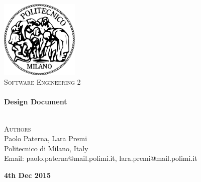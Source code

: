 \begin{titlepage}
\begin{center}


~\\[1cm]
\includegraphics[width=0.28\textwidth]{./images/logo-polimi}~\\[1.5cm]

\textsc{\huge \textsc{Software Engineering 2}
}
\\[1cm]

\HRule \\[0.4cm]
{ \huge \bfseries Design Document\\[0.3cm]
		}
\HRule \\[1.5cm]

\noindent
\begin{minipage}{1.0\textwidth}
\begin{center}


\textsc{\large{Authors}} \\
\large{
Paolo Paterna, Lara Premi \\
\vspace{0.8cm}
\small{
Politecnico di Milano, Italy\\
Email: paolo.paterna@mail.polimi.it, lara.premi@mail.polimi.it
}
}

\end{center}
\end{minipage}%

\vfill
\textbf{\large{4th Dec 2015}}

\end{center}
\end{titlepage}

